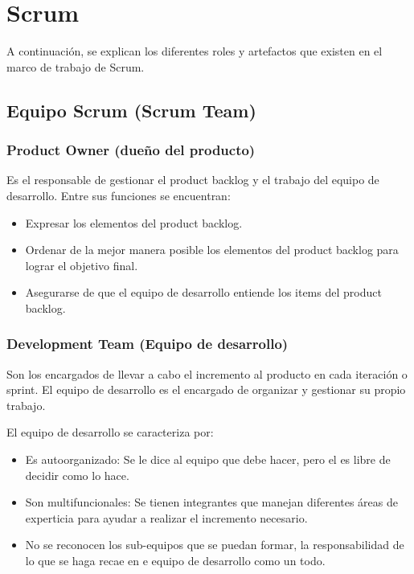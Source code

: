 \section{Scrum}

A continuación, se explican los diferentes roles y artefactos que existen en el marco de trabajo de Scrum.

\subsection{Equipo Scrum (Scrum Team)}

\subsubsection{Product Owner (dueño del producto)}

Es el responsable de gestionar el product backlog y el trabajo del equipo de desarrollo. Entre sus funciones se encuentran:
\begin{itemize}
		  \item Expresar los elementos del product backlog.
		  \item Ordenar de la mejor manera posible los elementos del product backlog para lograr el objetivo final.
		  \item Asegurarse de que el equipo de desarrollo entiende los items del product backlog.
		\end{itemize}
		
\subsubsection{Development Team (Equipo de desarrollo)}

Son los encargados de llevar a cabo el incremento al producto en cada iteración o sprint. El equipo de desarrollo es el encargado de organizar y gestionar su propio trabajo.

El equipo de desarrollo se caracteriza por:
	
\begin{itemize}
		  \item Es autoorganizado: Se le dice al equipo que debe hacer, pero el es libre de decidir como lo hace.
		  \item Son multifuncionales: Se tienen integrantes que manejan diferentes áreas de experticia para ayudar a realizar el incremento necesario.
		  \item No se reconocen los sub-equipos que se puedan formar, la responsabilidad de lo que se haga recae en e equipo de desarrollo como un todo.
		\end{itemize}

